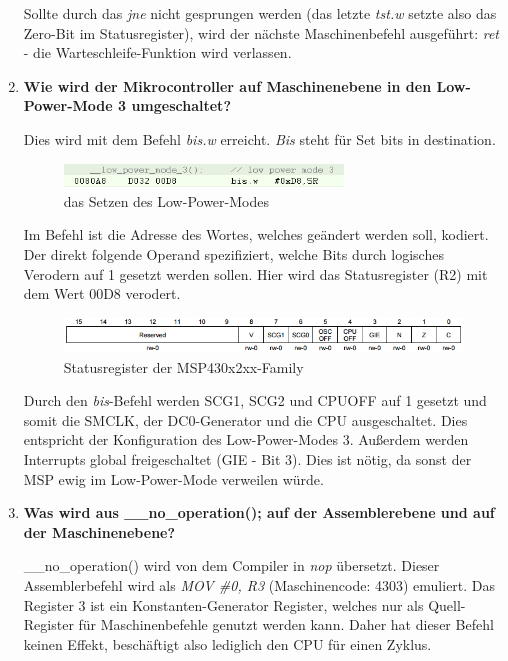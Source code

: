 \documentclass[12pt,a4paper,bibliography=totocnumbered,listof=totocnumbered]{scrartcl}
\begin{document}
\begin{enumerate}
	
	Sollte durch das \textit{jne} nicht gesprungen werden (das letzte \textit{tst.w} setzte also das Zero-Bit im Statusregister), wird der nächste Maschinenbefehl ausgeführt: \textit{ret} - die Warteschleife-Funktion wird verlassen.
	
	\item \textbf{Wie wird der Mikrocontroller auf Maschinenebene in den Low-Power-Mode 3 umgeschaltet?}
	
	Dies wird mit dem Befehl \textit{bis.w} erreicht. \textit{Bis} steht für \glqq Set bits in destination\grqq. 
	
	\begin{figure}[!htb]
		\centering
		\includegraphics[width=0.7\textwidth]{img/LowPowerMode.png}
		\caption{das Setzen des Low-Power-Modes}
	\end{figure}
	
	Im Befehl ist die Adresse des Wortes, welches geändert werden soll, kodiert. Der direkt folgende Operand spezifiziert, welche Bits durch logisches Verodern auf 1 gesetzt werden sollen. Hier wird das Statusregister (R2) mit dem Wert 00D8 verodert.
	
	\begin{figure}[!ht]
		\includegraphics[width=1\textwidth]{img/Statusregister.png}
		\caption{Statusregister der MSP430x2xx-Family}
	\end{figure}
	\FloatBarrier
	
	Durch den \textit{bis}-Befehl werden SCG1, SCG2 und CPUOFF auf 1 gesetzt und somit die SMCLK, der DC0-Generator und die CPU ausgeschaltet. Dies entspricht der Konfiguration des Low-Power-Modes 3. Außerdem werden Interrupts global freigeschaltet (GIE - Bit 3). Dies ist nötig, da sonst der MSP ewig im Low-Power-Mode verweilen würde.
	
	\item \textbf{Was wird aus \_\_no\_operation(); auf der Assemblerebene und auf der Maschinenebene?}
	
	\_\_no\_operation() wird von dem Compiler in \textit{nop} übersetzt. Dieser Assemblerbefehl wird als \textit{MOV \#0, R3} (Maschinencode: 4303) emuliert. Das Register 3 ist ein Konstanten-Generator Register, welches nur als Quell-Register für Maschinenbefehle genutzt werden kann. Daher hat dieser Befehl keinen Effekt, beschäftigt also lediglich den CPU für einen Zyklus.
	

\end{enumerate}
\end{document}
